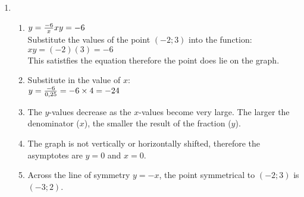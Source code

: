  \begin{solutions}{}{
 \begin{enumerate}[noitemsep, label=\textbf{\arabic*}. ] 
\item %

    \begin{enumerate}[noitemsep, label=\textbf{(\alph*)} ] 
    \item %
$y=\frac{-6}{x}\\
xy = -6$\\
Substitute the values of the point $(-2; 3)$ into the function:\\
$xy = (-2)(3) = -6$\\
This satistfies the equation therefore the point does lie on the graph.

    \item 
Substitute in the value of $x$:\\
$y=\frac{-6}{0,25} \\= -6 \times 4 \\
= -24$
\item The $y$-values decrease as the $x$-values become very large. The larger the denominator ($x$), the smaller the result of the fraction ($y$).%

    \item The graph is not vertically or horizontally shifted, therefore the asymptotes are $y=0$ and $x=0$.%
    \item Across the line of symmetry  $y=-x$, the point symmetrical to $(-2; 3)$ is $(-3;2)$.%


\end{enumerate}
\end{enumerate}}
\end{solutions}
